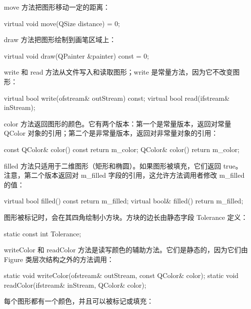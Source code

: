 move 方法把图形移动一定的距离：

\begin{codebox}
    virtual void move(QSize distance) = 0;
\end{codebox}

draw 方法把图形绘制到画笔区域上：

\begin{codebox}
    virtual void draw(QPainter &painter) const = 0;
\end{codebox}

write 和 read 方法从文件写入和读取图形；write 是常量方法，因为它不改变图形：

\begin{codebox}
    virtual bool write(ofstream& outStream) const;
    virtual bool read(ifstream& inStream);
\end{codebox}

color 方法返回图形的颜色。它有两个版本：第一个是常量版本，返回对常量 QColor 对象的引用；第二个是非常量版本，返回对非常量对象的引用：

\begin{codebox}
    const QColor& color() const {return m_color;}
    QColor& color() {return m_color;}
\end{codebox}

filled 方法只适用于二维图形（矩形和椭圆）。如果图形被填充，它们返回 true。注意，第二个版本返回对 m\_filled 字段的引用，这允许方法调用者修改 m\_filled 的值：

\begin{codebox}
    virtual bool filled() const {return m_filled;}
    virtual bool& filled() {return m_filled;}
\end{codebox}

图形被标记时，会在其四角绘制小方块。方块的边长由静态字段 Tolerance 定义：

\begin{codebox}
    static const int Tolerance;
\end{codebox}

writeColor 和 readColor 方法是读写颜色的辅助方法。它们是静态的，因为它们由 Figure 类层次结构之外的方法调用：

\begin{codebox}
    static void writeColor(ofstream& outStream,
                           const QColor& color);
    static void readColor(ifstream& inStream, QColor& color);
\end{codebox}

每个图形都有一个颜色，并且可以被标记或填充：

